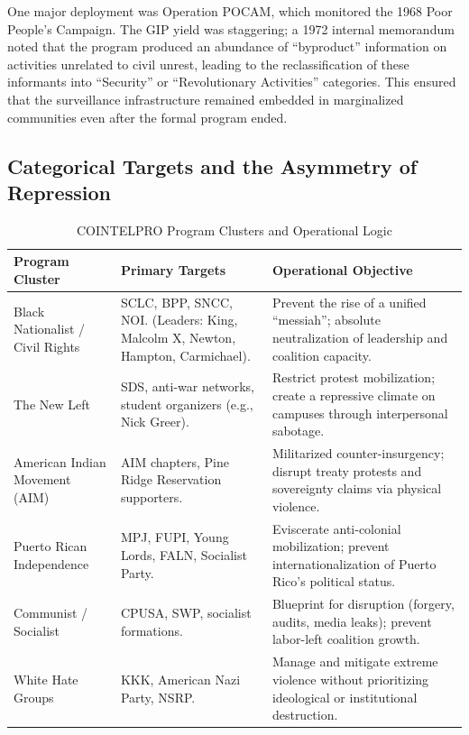 \documentclass[12pt,openany]{book}
\begin{document}
One major deployment was Operation POCAM, which monitored the 1968 Poor People's Campaign. The GIP yield was staggering; a 1972 internal memorandum noted that the program produced an abundance of ``byproduct'' information on activities unrelated to civil unrest, leading to the reclassification of these informants into ``Security'' or ``Revolutionary Activities'' categories. This ensured that the surveillance infrastructure remained embedded in marginalized communities even after the formal program ended.

\subsection{Categorical Targets and the Asymmetry of Repression}
\begin{table}[htbp]
\centering
\small
\caption{COINTELPRO Program Clusters and Operational Logic}
\label{tab:cointelpro_clusters}
\begin{tabular}{>{\raggedright}p{2.5cm} >{\raggedright}p{4.5cm} >{\raggedright\arraybackslash}p{7cm}}
\toprule
\textbf{Program Cluster} & \textbf{Primary Targets} & \textbf{Operational Objective} \\
\midrule
Black Nationalist / Civil Rights & SCLC, BPP, SNCC, NOI. (Leaders: King, Malcolm X, Newton, Hampton, Carmichael). & Prevent the rise of a unified ``messiah''; absolute neutralization of leadership and coalition capacity. \\
The New Left & SDS, anti-war networks, student organizers (e.g., Nick Greer). & Restrict protest mobilization; create a repressive climate on campuses through interpersonal sabotage. \\
American Indian Movement (AIM) & AIM chapters, Pine Ridge Reservation supporters. & Militarized counter-insurgency; disrupt treaty protests and sovereignty claims via physical violence. \\
Puerto Rican Independence & MPJ, FUPI, Young Lords, FALN, Socialist Party. & Eviscerate anti-colonial mobilization; prevent internationalization of Puerto Rico's political status. \\
Communist / Socialist & CPUSA, SWP, socialist formations. & Blueprint for disruption (forgery, audits, media leaks); prevent labor-left coalition growth. \\
White Hate Groups & KKK, American Nazi Party, NSRP. & Manage and mitigate extreme violence without prioritizing ideological or institutional destruction. \\
\bottomrule
\end{tabular}
\end{table}
\end{document}
